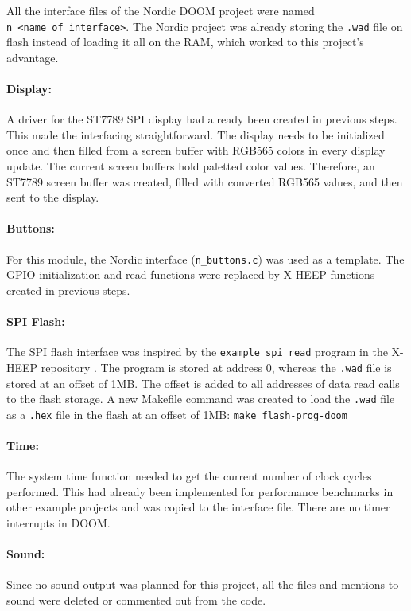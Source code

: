 All the interface files of the Nordic DOOM project were named \texttt{n\_<name\_of\_interface>}. The Nordic project was already storing the \texttt{.wad} file on flash instead of loading it all on the RAM, which worked to this project's advantage.

\paragraph{Display:} A driver for the ST7789 SPI display had already been created in previous steps. This made the interfacing straightforward. The display needs to be initialized once and then filled from a screen buffer with RGB565 colors in every display update. The current screen buffers hold paletted color values. Therefore, an ST7789 screen buffer was created, filled with converted RGB565 values, and then sent to the display.

\paragraph{Buttons:} For this module, the Nordic interface (\texttt{n\_buttons.c}) was used as a template. The GPIO initialization and read functions were replaced by X-HEEP functions created in previous steps.

\paragraph{SPI Flash:} The SPI flash interface was inspired by the \texttt{example\_spi\_read} program in the X-HEEP repository \cite{xHeepRepo}. The program is stored at address 0, whereas the \texttt{.wad} file is stored at an offset of 1MB. The offset is added to all addresses of data read calls to the flash storage. A new Makefile command was created to load the \texttt{.wad} file as a \texttt{.hex} file in the flash at an offset of 1MB:
\texttt{make flash-prog-doom} \\

\paragraph{Time:} The system time function needed to get the current number of clock cycles performed. This had already been implemented for performance benchmarks in other example projects and was copied to the interface file. There are no timer interrupts in DOOM.


\paragraph{Sound:} Since no sound output was planned for this project, all the files and mentions to sound were deleted or commented out from the code.


